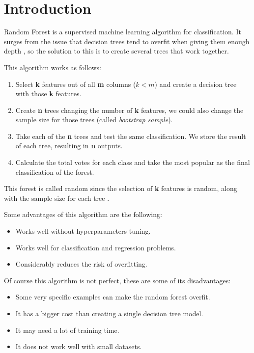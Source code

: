 \documentclass[10pt]{article}
\begin{document}
\section{Introduction}
Random Forest is a supervised machine learning algorithm for classification. It surges from the issue that decision trees tend to overfit when giving them enough depth \cite{aprendeML}, so the solution to this is to create several trees that work together. \par
This algorithm works as follows:
\begin{enumerate}
    \item Select \textbf{k} features out of all \textbf{m} columns ($k < m$) and create a decision tree with those \textbf{k} features.
    \item Create \textbf{n} trees changing the number of \textbf{k} features, we could also change the sample size for those trees (called \textit{bootstrap sample}).
    \item Take each of the \textbf{n} trees and test the same classification. We store the result of each tree, resulting in \textbf{n} outputs.
    \item Calculate the total votes for each class and take the most popular as the final classification of the forest.
\end{enumerate} \par
This forest is called random since the selection of \textbf{k} features is random, along with the sample size for each tree \cite{aprendeML}. \par
Some advantages of this algorithm are the following:
\begin{itemize}
    \item Works well without hyperparameters tuning.
    \item Works well for classification and regression problems.
    \item Considerably reduces the risk of overfitting.
\end{itemize} \par
Of course this algorithm is not perfect, these are some of its disadvantages:
\begin{itemize}
    \item Some very specific examples can make the random forest overfit.
    \item It has a bigger cost than creating a single decision tree model.
    \item It may need a lot of training time.
    \item It does not work well with small datasets.
\end{itemize}
\end{document}
